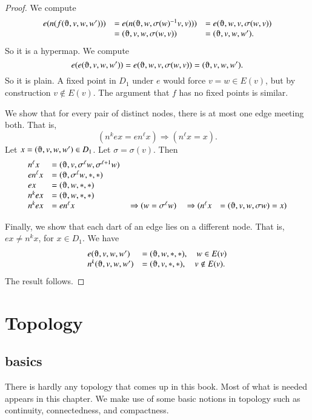\begin{proof}  We compute
    $$
\begin{array}{lll}
e(n(f(\orgn,v,w,w'))) &= e(n(\orgn,w,\sigma(w)^{-1} v,v))) &=
        e(\orgn,w,v,\sigma(w, v))\\ 
&= (\orgn,v,w,\sigma(w, v)) &= (\orgn,v,w,w').
\end{array}
$$
So it is a hypermap. We compute
    $$e(e(\orgn,v,w,w')) = e(\orgn,w,v,\sigma(w,v)) = (\orgn,v,w,w').$$
So it is plain. A fixed point in $D_1$ under $e$ would force $v = w\in E(v)$,
but by construction $v\not\in E(v)$.  The argument that $f$ has no
fixed points is similar.

   We show that for every pair of distinct nodes, there is at most one edge
meeting both.
That is,
        $$(n^k e x = e n^\ell x)\Rightarrow (n^\ell x = x).$$
Let $x = (\orgn,v,w,w')\in D_1$.  Let $\sigma=\sigma(v)$. Then
    $$
    \begin{array}{lllllll}
    n^\ell x &= (\orgn,v,\sigma^\ell w,\sigma^{\ell+1}w)\\
    e n^\ell x &= (\orgn,\sigma^\ell w,*,*)\\
    e x &= (\orgn,w,*,*)\\
    n^k e x &= (\orgn,w,*,*)\\
    n^k e x &= e n^\ell x &\ \Rightarrow (w = \sigma^\ell w) &\ \Rightarrow
    (n^\ell x &= (\orgn,v,w,\sigma w) = x)
    \end{array}
    $$

Finally, we show that each dart of an edge lies on a different node.
That is, $e x \ne n^k x$, for $x\in D_1$.  We have
    $$
    \begin{array}{lll}
        e(\orgn,v,w,w') &= (\orgn,w,*,*),\quad w\in E(v)\\
        n^k(\orgn,v,w,w') &= (\orgn,v,*,*),\quad v\not\in E(v).
    \end{array}
    $$
The result follows.
\end{proof}

\section{Topology}\label{sec:topology}

\subsection{basics}

There is hardly any topology that comes up in this book.  Most of
what is needed appears in this chapter.  We make use of some basic
notions in topology such as continuity, connectedness, and compactness.

